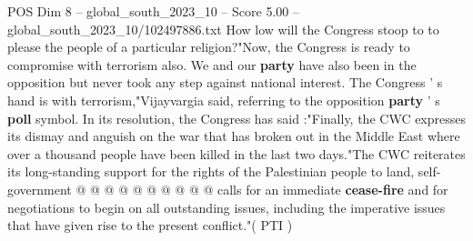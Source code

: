\begin{textsample}{POS Dim 8 – global\_south\_2023\_10 – Score 5.00 – global\_south\_2023\_10/102497886.txt}
How low will the Congress stoop to to please the people of a particular religion?"Now, the Congress is ready to compromise with terrorism also.
We and our \textbf{party} have also been in the opposition but never took any step against national interest.
The Congress ' s hand is with terrorism,"Vijayvargia said, referring to the opposition \textbf{party} ' s \textbf{poll} symbol.
In its resolution, the Congress has said :"Finally, the CWC expresses its dismay and anguish on the war that has broken out in the Middle East where over a thousand people have been killed in the last two days."The CWC reiterates its long-standing support for the rights of the Palestinian people to land, self-government @ @ @ @ @ @ @ @ @ @ calls for an immediate \textbf{cease-fire} and for negotiations to begin on all outstanding issues, including the imperative issues that have given rise to the present conflict."( PTI )

\end{textsample}
